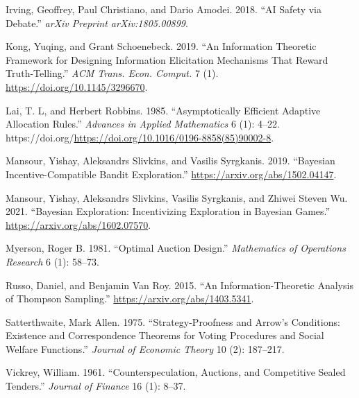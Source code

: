 \documentclass[
  letterpaper,
  numbers=noenddot,
  DIV=11]{scrreprt}
\newlength{\cslhangindent}
\newenvironment{CSLReferences}[2] %
 {\begin{list}{}{%
  \setlength{\itemindent}{0pt}
  \setlength{\leftmargin}{0pt}
  \setlength{\parsep}{0pt}
  \ifodd #1
   \setlength{\leftmargin}{\cslhangindent}
   \setlength{\itemindent}{-1\cslhangindent}
  \fi
  \setlength{\itemsep}{#2\baselineskip}}}
 {\end{list}}
\theoremstyle{plain}
\theoremstyle{definition}
\theoremstyle{remark}
\begin{document}
\begin{CSLReferences}{1}{0}
Irving, Geoffrey, Paul Christiano, and Dario Amodei. 2018. {``AI Safety
via Debate.''} \emph{arXiv Preprint arXiv:1805.00899}.

Kong, Yuqing, and Grant Schoenebeck. 2019. {``An Information Theoretic
Framework for Designing Information Elicitation Mechanisms That Reward
Truth-Telling.''} \emph{ACM Trans. Econ. Comput.} 7 (1).
\url{https://doi.org/10.1145/3296670}.

Lai, T. L, and Herbert Robbins. 1985. {``Asymptotically Efficient
Adaptive Allocation Rules.''} \emph{Advances in Applied Mathematics} 6
(1): 4--22.
https://doi.org/\url{https://doi.org/10.1016/0196-8858(85)90002-8}.

Mansour, Yishay, Aleksandrs Slivkins, and Vasilis Syrgkanis. 2019.
{``Bayesian Incentive-Compatible Bandit Exploration.''}
\url{https://arxiv.org/abs/1502.04147}.

Mansour, Yishay, Aleksandrs Slivkins, Vasilis Syrgkanis, and Zhiwei
Steven Wu. 2021. {``Bayesian Exploration: Incentivizing Exploration in
Bayesian Games.''} \url{https://arxiv.org/abs/1602.07570}.

Myerson, Roger B. 1981. {``Optimal Auction Design.''} \emph{Mathematics
of Operations Research} 6 (1): 58--73.

Russo, Daniel, and Benjamin Van Roy. 2015. {``An Information-Theoretic
Analysis of Thompson Sampling.''} \url{https://arxiv.org/abs/1403.5341}.

Satterthwaite, Mark Allen. 1975. {``Strategy-Proofness and Arrow's
Conditions: Existence and Correspondence Theorems for Voting Procedures
and Social Welfare Functions.''} \emph{Journal of Economic Theory} 10
(2): 187--217.

Vickrey, William. 1961. {``Counterspeculation, Auctions, and Competitive
Sealed Tenders.''} \emph{Journal of Finance} 16 (1): 8--37.

\end{CSLReferences}

\end{document}
